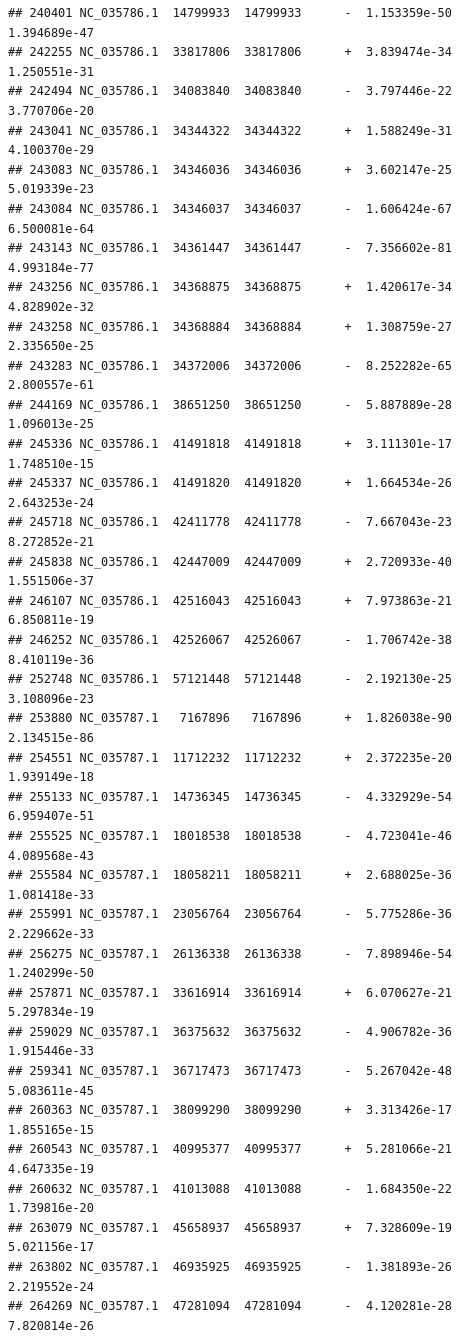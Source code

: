\documentclass[]{article}
\begin{document}
\begin{verbatim}
## 240401 NC_035786.1  14799933  14799933      -  1.153359e-50  1.394689e-47
## 242255 NC_035786.1  33817806  33817806      +  3.839474e-34  1.250551e-31
## 242494 NC_035786.1  34083840  34083840      -  3.797446e-22  3.770706e-20
## 243041 NC_035786.1  34344322  34344322      +  1.588249e-31  4.100370e-29
## 243083 NC_035786.1  34346036  34346036      +  3.602147e-25  5.019339e-23
## 243084 NC_035786.1  34346037  34346037      -  1.606424e-67  6.500081e-64
## 243143 NC_035786.1  34361447  34361447      -  7.356602e-81  4.993184e-77
## 243256 NC_035786.1  34368875  34368875      +  1.420617e-34  4.828902e-32
## 243258 NC_035786.1  34368884  34368884      +  1.308759e-27  2.335650e-25
## 243283 NC_035786.1  34372006  34372006      -  8.252282e-65  2.800557e-61
## 244169 NC_035786.1  38651250  38651250      -  5.887889e-28  1.096013e-25
## 245336 NC_035786.1  41491818  41491818      +  3.111301e-17  1.748510e-15
## 245337 NC_035786.1  41491820  41491820      +  1.664534e-26  2.643253e-24
## 245718 NC_035786.1  42411778  42411778      -  7.667043e-23  8.272852e-21
## 245838 NC_035786.1  42447009  42447009      +  2.720933e-40  1.551506e-37
## 246107 NC_035786.1  42516043  42516043      +  7.973863e-21  6.850811e-19
## 246252 NC_035786.1  42526067  42526067      -  1.706742e-38  8.410119e-36
## 252748 NC_035786.1  57121448  57121448      -  2.192130e-25  3.108096e-23
## 253880 NC_035787.1   7167896   7167896      +  1.826038e-90  2.134515e-86
## 254551 NC_035787.1  11712232  11712232      +  2.372235e-20  1.939149e-18
## 255133 NC_035787.1  14736345  14736345      -  4.332929e-54  6.959407e-51
## 255525 NC_035787.1  18018538  18018538      -  4.723041e-46  4.089568e-43
## 255584 NC_035787.1  18058211  18058211      +  2.688025e-36  1.081418e-33
## 255991 NC_035787.1  23056764  23056764      -  5.775286e-36  2.229662e-33
## 256275 NC_035787.1  26136338  26136338      -  7.898946e-54  1.240299e-50
## 257871 NC_035787.1  33616914  33616914      +  6.070627e-21  5.297834e-19
## 259029 NC_035787.1  36375632  36375632      -  4.906782e-36  1.915446e-33
## 259341 NC_035787.1  36717473  36717473      -  5.267042e-48  5.083611e-45
## 260363 NC_035787.1  38099290  38099290      +  3.313426e-17  1.855165e-15
## 260543 NC_035787.1  40995377  40995377      +  5.281066e-21  4.647335e-19
## 260632 NC_035787.1  41013088  41013088      -  1.684350e-22  1.739816e-20
## 263079 NC_035787.1  45658937  45658937      +  7.328609e-19  5.021156e-17
## 263802 NC_035787.1  46935925  46935925      -  1.381893e-26  2.219552e-24
## 264269 NC_035787.1  47281094  47281094      -  4.120281e-28  7.820814e-26

\end{verbatim}
\end{document}
